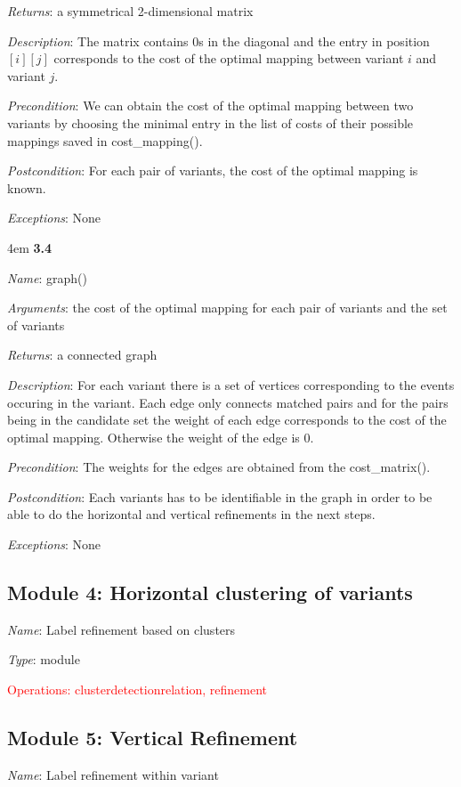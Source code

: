 \documentclass[notitlepage]{article}
\begin{document}
\begin{flushleft}
\textit{Returns}: a symmetrical 2-dimensional matrix

\textit{Description}: The matrix contains 0s in the diagonal and the entry in position $[i][j]$ corresponds to the cost of the optimal mapping between variant $i$ and variant $j$. 

\textit{Precondition}: We can obtain the cost of the optimal mapping between two variants by choosing the minimal entry in the list of costs of their possible mappings saved in cost\_mapping().

\textit{Postcondition}: For each pair of variants, the cost of the optimal mapping is known.

\textit{Exceptions}: None
\par
\endgroup


\medskip

\par
\begingroup
\leftskip4em
\textbf{3.4} 

\textit{Name}: graph()

\textit{Arguments}: the cost of the optimal mapping for each pair of variants and the set of variants

\textit{Returns}: a connected graph

\textit{Description}: For each variant there is a set of vertices corresponding to the events occuring in the variant. Each edge only connects matched pairs and for the pairs being in the candidate set the weight of each edge corresponds to the cost of the optimal mapping. Otherwise the weight of the edge is 0.

\textit{Precondition}: The weights for the edges are obtained from the cost\_matrix().

\textit{Postcondition}: Each variants has to be identifiable in the graph in order to be able to do the horizontal and vertical refinements in the next steps.

\textit{Exceptions}: None
\par
\endgroup


\subsection{Module 4: Horizontal clustering of variants}
\textit{Name}: Label refinement based on clusters

\textit{Type}: module

\textcolor{red}{Operations: clusterdetectionrelation, refinement}

\subsection{Module 5: Vertical Refinement}
\textit{Name}: Label refinement within variant


\end{flushleft}
\end{document}
